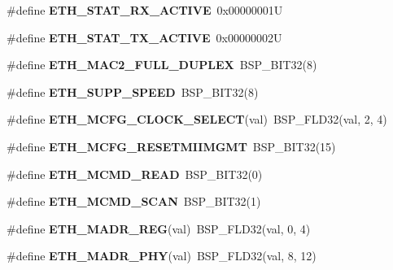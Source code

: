 \begin{DoxyCompactItemize}
\#define {\bfseries E\+T\+H\+\_\+\+S\+T\+A\+T\+\_\+\+R\+X\+\_\+\+A\+C\+T\+I\+VE}~0x00000001U
\item 
\mbox{\label{lpc-ethernet_8c_a6e8bbd8208cbe83ce5ff8e2420ff08ad}} 
\#define {\bfseries E\+T\+H\+\_\+\+S\+T\+A\+T\+\_\+\+T\+X\+\_\+\+A\+C\+T\+I\+VE}~0x00000002U
\item 
\mbox{\label{lpc-ethernet_8c_a9ee0581a9dd5ef581cd5f78aa433d1c5}} 
\#define {\bfseries E\+T\+H\+\_\+\+M\+A\+C2\+\_\+\+F\+U\+L\+L\+\_\+\+D\+U\+P\+L\+EX}~B\+S\+P\+\_\+\+B\+I\+T32(8)
\item 
\mbox{\label{lpc-ethernet_8c_a52e89c0f0b6fe6b08dba434d1e0c2bc6}} 
\#define {\bfseries E\+T\+H\+\_\+\+S\+U\+P\+P\+\_\+\+S\+P\+E\+ED}~B\+S\+P\+\_\+\+B\+I\+T32(8)
\item 
\mbox{\label{lpc-ethernet_8c_a05ae6fd03ab551251e4ac653941f0bc3}} 
\#define {\bfseries E\+T\+H\+\_\+\+M\+C\+F\+G\+\_\+\+C\+L\+O\+C\+K\+\_\+\+S\+E\+L\+E\+CT}(val)~B\+S\+P\+\_\+\+F\+L\+D32(val, 2, 4)
\item 
\mbox{\label{lpc-ethernet_8c_a971e72211351c5c6447499a870a0b9c0}} 
\#define {\bfseries E\+T\+H\+\_\+\+M\+C\+F\+G\+\_\+\+R\+E\+S\+E\+T\+M\+I\+I\+M\+G\+MT}~B\+S\+P\+\_\+\+B\+I\+T32(15)
\item 
\mbox{\label{lpc-ethernet_8c_a758db6f66484db0aae9c6a336f8d3223}} 
\#define {\bfseries E\+T\+H\+\_\+\+M\+C\+M\+D\+\_\+\+R\+E\+AD}~B\+S\+P\+\_\+\+B\+I\+T32(0)
\item 
\mbox{\label{lpc-ethernet_8c_add11d61b98525216f262a9e2ad9b011c}} 
\#define {\bfseries E\+T\+H\+\_\+\+M\+C\+M\+D\+\_\+\+S\+C\+AN}~B\+S\+P\+\_\+\+B\+I\+T32(1)
\item 
\mbox{\label{lpc-ethernet_8c_a6106230a56102183a120adf9f4b3d9eb}} 
\#define {\bfseries E\+T\+H\+\_\+\+M\+A\+D\+R\+\_\+\+R\+EG}(val)~B\+S\+P\+\_\+\+F\+L\+D32(val, 0, 4)
\item 
\mbox{\label{lpc-ethernet_8c_a02a4c62c3f21d335e11f13623fe7be3c}} 
\#define {\bfseries E\+T\+H\+\_\+\+M\+A\+D\+R\+\_\+\+P\+HY}(val)~B\+S\+P\+\_\+\+F\+L\+D32(val, 8, 12)

\end{DoxyCompactItemize}
